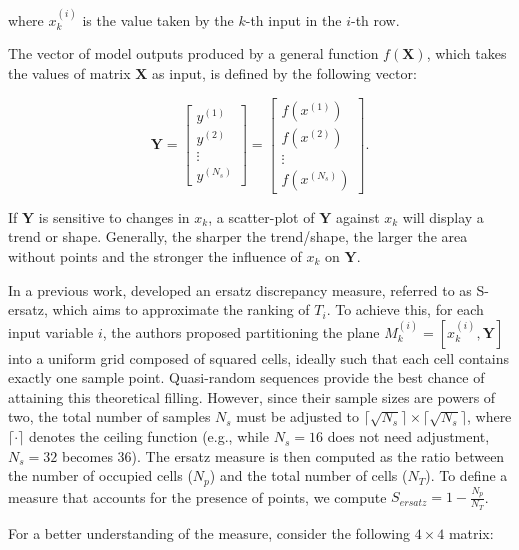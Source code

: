 \documentclass[12pt]{article}
\begin{document}
where $x_k^{(i)}$ is the value taken by the $k$-th input in the $i$-th row.

The vector of model outputs produced by a general function $f(\mathbf{X})$, which takes the values of matrix $\mathbf{X}$ as input, is defined by the following vector:

\begin{equation*}
    \bm{Y}=
    \begin{bmatrix}
        y^{(1)}   \\
        y^{(2)}   \\
        \vdots    \\
        y^{(N_s)}
    \end{bmatrix}
    =
    \begin{bmatrix}
        f(x^{(1)})   \\
        f(x^{(2)})   \\
        \vdots       \\
        f(x^{(N_s)})
    \end{bmatrix}.
\end{equation*}

If $\bm{Y}$ is sensitive to changes in $x_k$, a scatter-plot of $\bm{Y}$ against $x_k$ will display a trend or shape. Generally, the sharper the trend/shape, the larger the area without points and the stronger the influence of $x_k$ on $\bm{Y}$.

In a previous work, \citet{puy2024discrepancy} developed an ersatz discrepancy measure, referred to as S-ersatz, which aims to approximate the ranking of $T_i$. To achieve this, for each input variable $i$, the authors proposed partitioning the plane $M^{(i)}_k = [x^{(i)}_k, \bm{Y}]$ into a uniform grid composed of squared cells, ideally such that each cell contains exactly one sample point. Quasi-random sequences provide the best chance of attaining this theoretical filling. However, since their sample sizes are powers of two, the total number of samples $N_s$ must be adjusted to $\lceil\sqrt{N_s}\rceil \times \lceil\sqrt{N_s}\rceil$, where $\lceil \cdot \rceil$ denotes the ceiling function (e.g., while $N_s=16$ does not need adjustment, $N_s=32$ becomes 36). The ersatz measure is then computed as the ratio between the number of occupied cells ($N_p$) and the total number of cells ($N_T$). To define a measure that accounts for the presence of points, we compute $S_{ersatz}=1-\frac{N_p}{N_T}$.

For a better understanding of the measure, consider the following $4 \times 4$ matrix:
\end{document}
